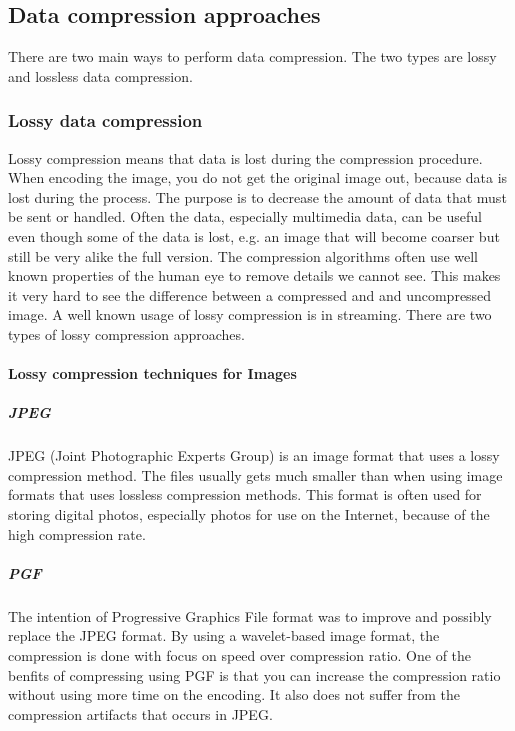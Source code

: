 \subsection{Data compression approaches}
There are two main ways to perform data compression. The two types are lossy and lossless data compression. \cite{bib:dataCompression}

\subsubsection{Lossy data compression}
Lossy compression means that data is lost during the compression procedure. When encoding the image, you do not get the original image out, because data is lost during the process. The purpose is to decrease the amount of data that must be sent or handled. Often the data, especially multimedia data, can be useful even though some of the data is lost, e.g. an image that will become coarser but still be very alike the full version. The compression algorithms often use well known properties of the human eye to remove details we cannot see. This makes it very hard to see the difference between a compressed and and uncompressed image. A well known usage of lossy compression is in streaming. There are two types of lossy compression approaches. \cite{bib:lossyCompression}

\paragraph{Lossy compression techniques for Images}

\subparagraph{JPEG} \hfill
\newline
JPEG (Joint Photographic Experts Group) is an image format that uses a lossy compression method. The files usually gets much smaller than when using image formats that uses lossless compression methods. This format is often used for storing digital photos, especially photos for use on the Internet, because of the high compression rate. \cite{bib:JPEG}


\subparagraph{PGF} \hfill
\newline
The intention of Progressive Graphics File format was to improve and possibly replace the JPEG format. By using a wavelet-based image format, the compression is done with focus on speed over compression ratio. One of the benfits of compressing using PGF is that you can increase the compression ratio without using more time on the encoding. It also does not suffer from the compression artifacts that occurs in JPEG.
\cite{bib:PGF}

